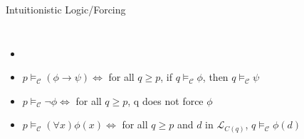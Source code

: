 \documentclass{beamer}
\begin{document}
\begin{frame}{Intuitionistic Logic/Forcing}

\begin{columns}

\scriptsize{
    \begin{itemize}







\item    \textbf{}\\

\item    \textcolor{black!30}{$ p \vDash_{\mathcal{C}} (\phi \to \psi)      \Leftrightarrow$   for all $q \geq p$, if $q \vDash_{\mathcal{C}} \phi$, then $q \vDash_{\mathcal{C}} \psi$}\\

\item    \textcolor{black!30}{$ p \vDash_{\mathcal{C}} \neg \phi            \Leftrightarrow $  for all $q \geq p$, q does not force $\phi$}\\

\item    \textcolor{black!30}{$ p \vDash_{\mathcal{C}} (\forall x) \phi(x)  \Leftrightarrow $  for all $q \geq p$ and $d$ in $\mathcal{L}_{C(q)}$, $q \vDash_{\mathcal{C}} \phi(d)$}\\


\end{itemize}}
\end{columns}
\end{frame}
\end{document}
